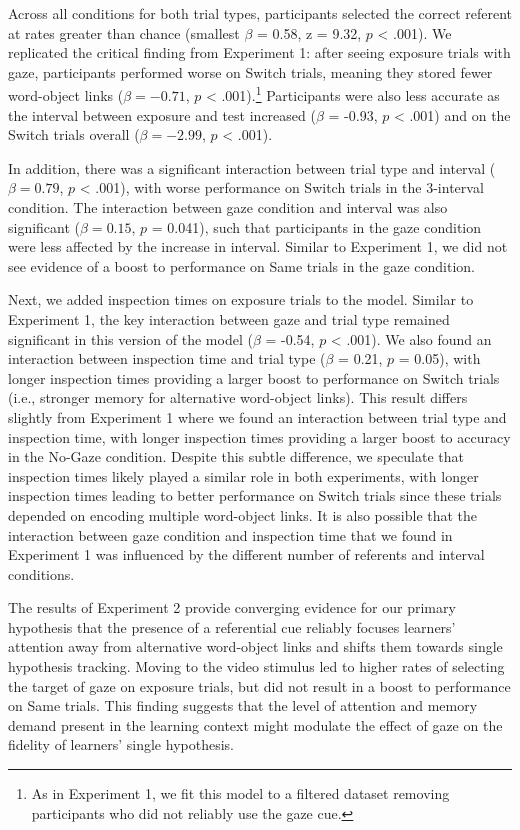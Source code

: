 \documentclass[oneside]{report}
\begin{document}
Across all conditions for both trial types, participants selected the
correct referent at rates greater than chance (smallest \(\beta\) =
0.58, z = 9.32, \(p\) \textless{} .001). We replicated the critical
finding from Experiment 1: after seeing exposure trials with gaze,
participants performed worse on Switch trials, meaning they stored fewer
word-object links (\(\beta = -0.71\), \(p\) \textless{}
.001).\footnote{As in Experiment 1, we fit this model to a filtered dataset removing participants who did not reliably use the gaze cue.}
Participants were also less accurate as the interval between exposure
and test increased (\(\beta\) = -0.93, \(p\) \textless{} .001) and on
the Switch trials overall (\(\beta = -2.99\), \(p\) \textless{} .001).

In addition, there was a significant interaction between trial type and
interval (\(\beta = 0.79\), \(p\) \textless{} .001), with worse
performance on Switch trials in the 3-interval condition. The
interaction between gaze condition and interval was also significant
(\(\beta = 0.15\), \(p\) = 0.041), such that participants in the gaze
condition were less affected by the increase in interval. Similar to
Experiment 1, we did not see evidence of a boost to performance on Same
trials in the gaze condition.

Next, we added inspection times on exposure trials to the model. Similar
to Experiment 1, the key interaction between gaze and trial type
remained significant in this version of the model (\(\beta\) = -0.54,
\(p\) \textless{} .001). We also found an interaction between inspection
time and trial type (\(\beta\) = 0.21, \(p\) = 0.05), with longer
inspection times providing a larger boost to performance on Switch
trials (i.e., stronger memory for alternative word-object links). This
result differs slightly from Experiment 1 where we found an interaction
between trial type and inspection time, with longer inspection times
providing a larger boost to accuracy in the No-Gaze condition. Despite
this subtle difference, we speculate that inspection times likely played
a similar role in both experiments, with longer inspection times leading
to better performance on Switch trials since these trials depended on
encoding multiple word-object links. It is also possible that the
interaction between gaze condition and inspection time that we found in
Experiment 1 was influenced by the different number of referents and
interval conditions.

The results of Experiment 2 provide converging evidence for our primary
hypothesis that the presence of a referential cue reliably focuses
learners' attention away from alternative word-object links and shifts
them towards single hypothesis tracking. Moving to the video stimulus
led to higher rates of selecting the target of gaze on exposure trials,
but did not result in a boost to performance on Same trials. This
finding suggests that the level of attention and memory demand present
in the learning context might modulate the effect of gaze on the
fidelity of learners' single hypothesis.
\end{document}
